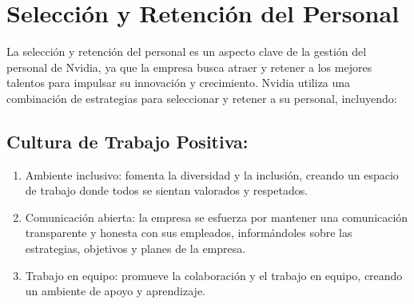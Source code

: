 \documentclass{article}
\begin{document}
\newpage

\section{Selección y Retención del Personal}
 
La selección y retención del personal es un aspecto clave de la gestión del personal de Nvidia, ya que la empresa busca atraer y retener a los mejores talentos para impulsar su innovación y crecimiento. Nvidia utiliza una combinación de estrategias para seleccionar y retener a su personal, incluyendo:

\subsection{Cultura de Trabajo Positiva:}

\begin{enumerate}
  \item Ambiente inclusivo: fomenta la diversidad y la inclusión, creando un espacio de trabajo donde todos se sientan valorados y respetados. 
  \item Comunicación abierta: la empresa se esfuerza por mantener una comunicación transparente y honesta con sus empleados, informándoles sobre las estrategias, objetivos y planes de la empresa. 
  \item Trabajo en equipo: promueve la colaboración y el trabajo en equipo, creando un ambiente de apoyo y aprendizaje. 
\end{enumerate}



 


 


 


\end{document}
